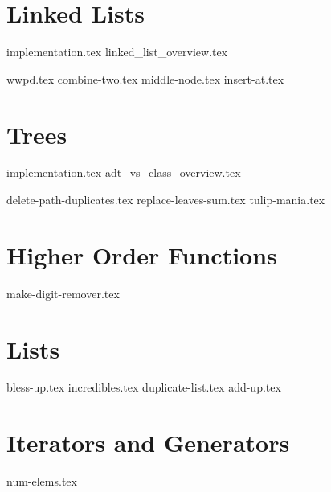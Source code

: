 \documentclass{exam}
\begin{document}
\section{Linked Lists}
    {implementation.tex}
    {linked_list_overview.tex}
\begin{questions}
    {wwpd.tex}
    {combine-two.tex}
    {middle-node.tex}
    \newpage
    {insert-at.tex}
\end{questions}

\newpage
\section{Trees}
{implementation.tex}
{adt_vs_class_overview.tex}
\newpage
\begin{questions}
    {delete-path-duplicates.tex}
    \newpage
    {replace-leaves-sum.tex}
    \newpage
    {tulip-mania.tex}
\end{questions}

\section{Higher Order Functions}
\begin{questions}
    {make-digit-remover.tex}
\end{questions}

\section{Lists}
\begin{questions}
    {bless-up.tex}
    {incredibles.tex}
    {duplicate-list.tex}
    {add-up.tex}
\end{questions}

\section{Iterators and Generators}
\begin{questions}
    {num-elems.tex}
\end{questions}
\end{document}
